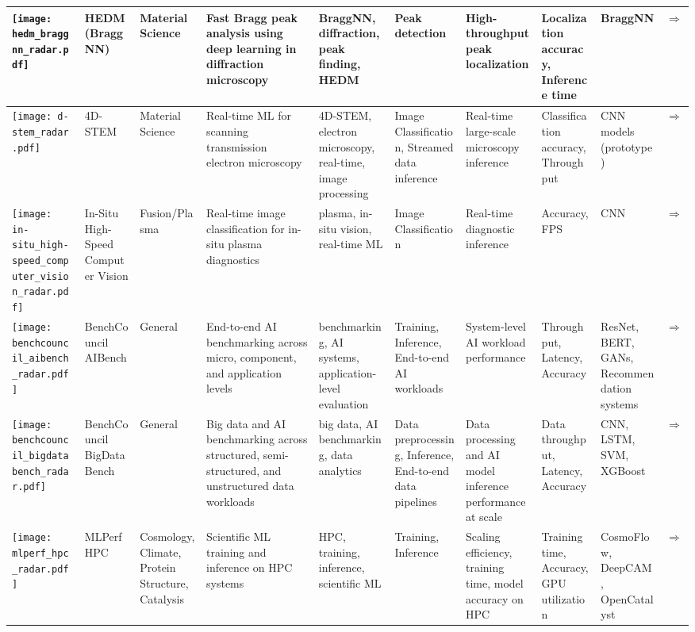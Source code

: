 \begin{landscape}
{\begin{longtable}{|p{}|p{}|p{}|p{}|p{}|p{}|p{}|p{}|p{}|p{}|}
\texttt{[image: hedm\_braggnn\_radar.pdf]} & HEDM (BraggNN) & Material Science & Fast Bragg peak analysis using deep learning in diffraction microscopy & BraggNN, diffraction, peak finding, HEDM & Peak detection & High-throughput peak localization & Localization accuracy, Inference time & BraggNN & \cite{liu2021braggnnfastxraybragg}\href{https://arxiv.org/abs/2008.08198}{$\Rightarrow$} \\ \hline
\texttt{[image: d-stem\_radar.pdf]} & 4D-STEM & Material Science & Real-time ML for scanning transmission electron microscopy & 4D-STEM, electron microscopy, real-time, image processing & Image Classification, Streamed data inference & Real-time large-scale microscopy inference & Classification accuracy, Throughput & CNN models (prototype) & \cite{qin2023extremely}\href{https://openreview.net/pdf?id=7yt3N0o0W9}{$\Rightarrow$} \\ \hline
\texttt{[image: in-situ\_high-speed\_computer\_vision\_radar.pdf]} & In-Situ High-Speed Computer Vision & Fusion/Plasma & Real-time image classification for in-situ plasma diagnostics & plasma, in-situ vision, real-time ML & Image Classification & Real-time diagnostic inference & Accuracy, FPS & CNN & \cite{wei2024lowlatencyopticalbasedmode}\href{https://arxiv.org/abs/2312.00128}{$\Rightarrow$} \\ \hline
\texttt{[image: benchcouncil\_aibench\_radar.pdf]} & BenchCouncil AIBench & General & End-to-end AI benchmarking across micro, component, and application levels & benchmarking, AI systems, application-level evaluation & Training, Inference, End-to-end AI workloads & System-level AI workload performance & Throughput, Latency, Accuracy & ResNet, BERT, GANs, Recommendation systems & \cite{gao2019aibenchindustrystandardinternet}\href{https://www.benchcouncil.org/AIBench/}{$\Rightarrow$} \\ \hline
\texttt{[image: benchcouncil\_bigdatabench\_radar.pdf]} & BenchCouncil BigDataBench & General & Big data and AI benchmarking across structured, semi-structured, and unstructured data workloads & big data, AI benchmarking, data analytics & Data preprocessing, Inference, End-to-end data pipelines & Data processing and AI model inference performance at scale & Data throughput, Latency, Accuracy & CNN, LSTM, SVM, XGBoost & \cite{gao2018bigdatabenchscalableunifiedbig}\href{https://www.benchcouncil.org/BigDataBench/}{$\Rightarrow$} \\ \hline
\texttt{[image: mlperf\_hpc\_radar.pdf]} & MLPerf HPC & Cosmology, Climate, Protein Structure, Catalysis & Scientific ML training and inference on HPC systems & HPC, training, inference, scientific ML & Training, Inference & Scaling efficiency, training time, model accuracy on HPC & Training time, Accuracy, GPU utilization & CosmoFlow, DeepCAM, OpenCatalyst & \cite{farrell2021mlperfhpcholisticbenchmark}\href{https://github.com/mlcommons/hpc}{$\Rightarrow$} \\ \hline

\end{longtable}}
\end{landscape}
